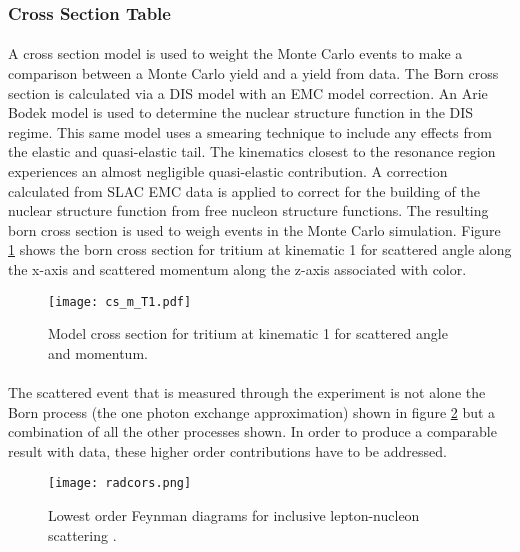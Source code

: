 \subsubsection{Cross Section Table}
\vspace{-10pt}\paragraph{} A cross section model is used to weight the Monte Carlo events to make a comparison between a Monte Carlo yield and a yield from data. The Born cross section is calculated via a DIS model with an EMC model correction. An Arie Bodek model \cite{DISmodel} is used to determine the nuclear structure function in the DIS regime. This same model uses a smearing technique to include any effects from the elastic and quasi-elastic tail. The kinematics closest to the resonance region experiences an almost negligible quasi-elastic contribution. A correction calculated from SLAC EMC data is applied to correct for the building of the nuclear structure function from free nucleon structure functions. The resulting born cross section is used to weigh events in the Monte Carlo simulation. Figure \ref{MCS} shows the born cross section for tritium at kinematic 1 for scattered angle along the x-axis and scattered momentum along the z-axis associated with color.  

\begin{figure}
	\caption{Model cross section for tritium at kinematic 1 for scattered angle and momentum. \label{MCS}}
	\hspace{-40pt}
	\texttt{[image: cs\_m\_T1.pdf]}
\end{figure}
\paragraph{} The scattered event that is measured through the experiment is not alone the Born process (the one photon exchange approximation) shown in figure \ref{fig:radcors} but a combination of all the other processes shown. In order to produce a comparable result with data, these higher order contributions have to be addressed.
\begin{figure}[h]
	\centering
	\texttt{[image: radcors.png]}
	\caption{Lowest order Feynman diagrams for inclusive lepton-nucleon scattering \cite{Ajth}.}
	\label{fig:radcors}
\end{figure} 
